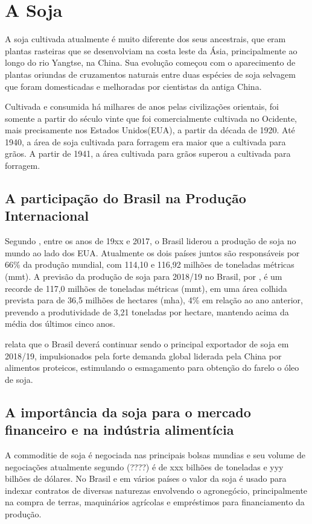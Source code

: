 

\section{A Soja}
A soja cultivada atualmente é muito diferente dos seus ancestrais, que eram plantas rasteiras que se desenvolviam na costa leste da Ásia, principalmente ao longo do rio Yangtse, na China.  Sua evolução começou com o aparecimento  de plantas oriundas de cruzamentos naturais entre duas espécies de soja selvagem que foram domesticadas e melhoradas por cientistas da antiga China.

Cultivada e consumida há milhares de anos pelas civilizações orientais, foi somente a partir do século vinte que foi comercialmente cultivada no Ocidente, mais precisamente nos Estados Unidos(EUA), a partir da década de 1920. Até 1940, a área de soja cultivada para forragem era maior que a cultivada para grãos. A partir de 1941, a área cultivada para grãos superou a cultivada para forragem. \cite{Amelio2011}

\subsection{A participação do Brasil na Produção Internacional}
Segundo , entre os anos de 19xx e 2017, o Brasil liderou a produção de soja no mundo ao lado dos EUA. Atualmente os dois países juntos são responsáveis por 66\% da produção mundial, com 114,10 e 116,92 milhões de toneladas métricas (mmt). A previsão da produção de soja para 2018/19 no Brasil, por \cite{FAS2018}, é um recorde de 117,0 milhões de toneladas métricas (mmt), em uma área colhida prevista para de 36,5 milhões de hectares (mha), 4\% em relação ao ano anterior, prevendo a produtividade de 3,21 toneladas por hectare, mantendo acima da média dos últimos cinco anos. 

\citeauthor{FAS2018} relata que o Brasil deverá continuar sendo o principal exportador de soja em 2018/19, impulsionados pela forte demanda global liderada pela China por alimentos proteicos, estimulando o esmagamento para obtenção do farelo o óleo de soja.


\subsection{A importância da soja para o mercado financeiro e na indústria alimentícia}
A commoditie de soja é negociada nas principais bolsas mundias e seu volume de negociações atualmente segundo (????) é de xxx bilhões de toneladas e yyy bilhões de dólares. No Brasil e em vários países o valor da soja é usado para indexar contratos de diversas naturezas envolvendo o agronegócio, principalmente na compra de terras, maquinários agrícolas e empréstimos para financiamento da produção.

